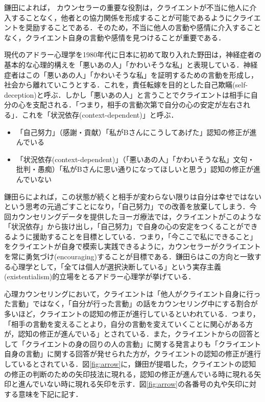 \documentclass[shuuron]{kuee}
\begin{document}
鎌田\cite{kamata2002}によれば， カウンセラーの重要な役割は，クライエントが不当に他人に介入することなく，他者との協力関係を形成することが可能であるようにクライエントを奨励することである．そのため，不当に他人の言動や感情に介入することなく，クライエント自身の言動や感情を見つけることが重要である．

現代のアドラー心理学を1980年代に日本に初めて取り入れた野田\cite{zokad}は，神経症者の基本的な心理的構えを「悪いあの人」「かわいそうな私」と表現している．神経症者はこの「悪いあの人」「かわいそうな私」を証明するための言動を形成し，社会から離れていこうとする．これを，責任転嫁を目的とした自己欺瞞(self-deception)と呼ぶ\cite{Darshana}．しかし「悪いあの人」と言うことでクライエントは相手に自分の心を支配される．「つまり，相手の言動次第で自分の心の安定が左右される」．これを「状況依存(context-dependent)」と呼ぶ．
\begin{itemize}
  \item 「自己努力」（感謝・貢献）「私がBさんにこうしてあげた」認知の修正が進んでいる
  \item 「状況依存(context-dependent)」（「悪いあの人」「かわいそうな私」文句・批判・愚痴）「私がBさんに思い通りになってほしいと思う」認知の修正が進んでいない
\end{itemize}

鎌田ら\cite{Darshana}によれば，この状態が続くと相手が変わらない限りは自分は幸せではないという思考の元過ごすことになり，「自己努力」での改善を放棄してしまう．今回カウンセリングデータを提供したヨーガ療法では，クライエントがこのような「状況依存」から抜け出し，「自己努力」で自身の心の安定をつくることができるように援助することを目標としている．つまり，「今ここで私にできること」をクライエントが自身で模索し実践できるように，カウンセラーがクライエントを常に勇気づけ(encouraging)することが目標である．鎌田らはこの方向と一致する心理学として，「全ては個人が選択決断している」という実存主義(existentialism)的立場をとるアドラー心理学が挙げている．

心理カウンセリングにおいて，クライエントは「他人がクライエント自身に行った言動」ではなく，「自分が行った言動」の話をカウンセリング中にする割合が多いほど，クライエントの認知の修正が進行しているといわれている．つまり，「相手の言動を変えることより，自分の言動を変えていくことに関心がある方が，認知の修正が進んでいる」\cite{zokad}とされている．また，クライエントからの回答として「クライエントの身の回りの人の言動」に関する発言よりも「クライエント自身の言動」に関する回答が発せられた方が，クライエントの認知の修正が進行しているとされている．図\ref{fig:arrow}に，鎌田\cite{鎌田穣2002臨床}が提唱した，クライエントの認知の修正の判断のための矢印技法に現れる，認知の修正が進んでいる時に現れる矢印と進んでいない時に現れる矢印を示す．図\ref{fig:arrow}の各番号の丸や矢印に対する意味を下記に記す．
\end{document}
